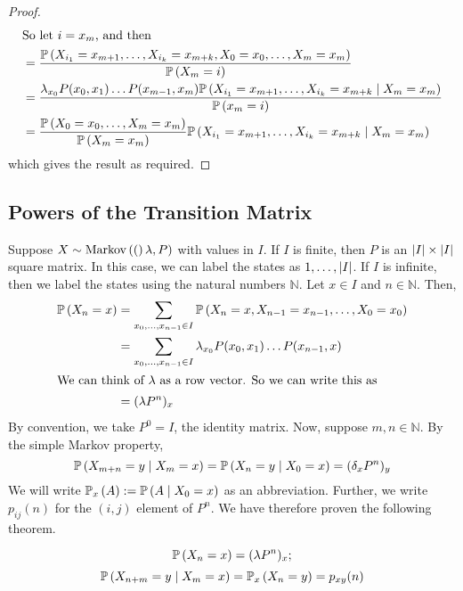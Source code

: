 \begin{proof}
\begin{align*}
		\intertext{So let \( i = x_m \), and then}
		                                                                                             & = \frac{\mathbb{P}\left({X_{i_1} = x_{m+1}, \dots, X_{i_k} = x_{m+k}, X_0 = x_0, \dots, X_m = x_m}\right)}{\mathbb{P}\left({X_m = i}\right)}                                   \\
		                                                                                             & = \frac{\lambda_{x_0} P(x_0, x_1) \dots P(x_{m-1}, x_m) \mathbb{P}\left({X_{i_1} = x_{m+1}, \dots, X_{i_k} = x_{m+k} \mid X_m = x_m}\right)}{\mathbb{P}\left({x_m = i}\right)} \\
		                                                                                             & = \frac{\mathbb{P}\left({X_0 = x_0, \dots, X_m = x_m}\right)}{\mathbb{P}\left({X_m = x_m}\right)} \mathbb{P}\left({X_{i_1} = x_{m+1}, \dots, X_{i_k} = x_{m+k} \mid X_m = x_m}\right)
	\end{align*}
	which gives the result as required.
\end{proof}

\subsection{Powers of the Transition Matrix}
Suppose \( X \sim \operatorname{Markov}\left({(}\right)\lambda, P) \) with values in \( I \).
If \( I \) is finite, then \( P \) is an \( \abs{I} \times \abs{I} \) square matrix.
In this case, we can label the states as \( 1, \dots, \abs{I} \).
If \( I \) is infinite, then we label the states using the natural numbers \( \mathbb N \).
Let \( x \in I \) and \( n \in \mathbb N \).
Then,
\begin{align*}
	\mathbb{P}\left({X_n = x}\right) & = \sum_{x_0, \dots, x_{n-1} \in I} \mathbb{P}\left({X_n = x, X_{n-1} = x_{n-1}, \dots, X_0 = x_0}\right) \\
	               & = \sum_{x_0, \dots, x_{n-1} \in I} \lambda_{x_0} P(x_0, x_1) \dots P(x_{n-1}, x)       \\
	\intertext{We can think of \( \lambda \) as a row vector.
		So we can write this as}
	               & = (\lambda P^n)_x
\end{align*}
By convention, we take \( P^0 = I \), the identity matrix.
Now, suppose \( m, n \in \mathbb N \).
By the simple Markov property,
\[
	\mathbb{P}\left({X_{m+n} = y \mid X_m = x}\right) = \mathbb{P}\left({X_n = y \mid X_0 = x}\right) = ( \delta_x P^n )_y
\]
We will write \( \mathbb{P}_{x}\left({A}\right) := \mathbb{P}\left({A \mid X_0 = x}\right) \) as an abbreviation.
Further, we write \( p_{ij}(n) \) for the \( (i,j) \) element of \( P^n \).
We have therefore proven the following theorem.
\begin{theorem}
	\[
		\mathbb{P}\left({X_n = x}\right) = (\lambda P^n)_x;
	\]
	\[
		\mathbb{P}\left({X_{n+m} = y \mid X_m = x}\right) = \mathbb{P}_{x}\left({X_n = y}\right) = p_{xy}(n)
	\]
\end{theorem}

